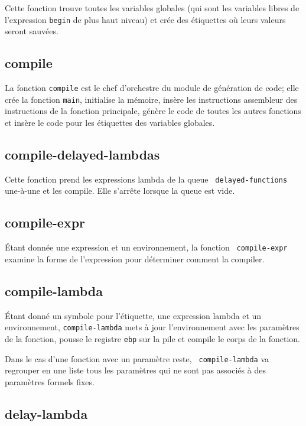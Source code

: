 \documentclass[11pt]{report}
\begin{document}
Cette fonction trouve toutes les variables globales (qui sont les
variables libres de l'expression {\tt begin} de plus haut niveau) et
crée des étiquettes où leurs valeurs seront sauvées.

\subsection{compile}

La fonction {\tt compile} est le chef d'orchestre du module de
génération de code; elle crée la fonction {\tt main}, initialise la
mémoire, insère les instructions assembleur des instructions de la
fonction principale, génère le code de toutes les autres fonctions et
insère le code pour les étiquettes des variables globales.


\subsection{compile-delayed-lambdas}

Cette fonction prend les expressions lambda de la queue {\tt
  delayed-functions} une-à-une et les compile.  Elle s'arrête lorsque
la queue est vide.


\subsection{compile-expr}

Étant donnée une expression et un environnement, la fonction {\tt
  compile-expr} examine la forme de l'expression pour déterminer
comment la compiler.

\subsection{compile-lambda}

Étant donné un symbole pour l'étiquette, une expression lambda et un
environnement, {\tt compile-lambda} mets à jour l'environnement avec
les paramètres de la fonction, pousse le registre {\tt ebp} sur la
pile et compile le corps de la fonction.

Dans le cas d'une fonction avec un paramètre reste, {\tt
  compile-lambda} va regrouper en une liste tous les paramètres qui ne
sont pas associés à des paramètres formels fixes.

\subsection{delay-lambda}
\end{document}
